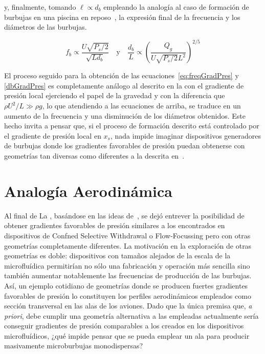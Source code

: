 y, finalmente, tomando $\ell \propto d_{b}$ empleando la analogía al caso de formación de burbujas en una piscina en reposo~\cite{Evangelio2015b}, la expresión final de la frecuencia y los diámetros de las burbujas. 

\begin{equation}
f_{b} \propto \dfrac{U\sqrt{P_{s}/2}}{\sqrt{L d_{b}}} \quad \mathrm{y} \quad \dfrac{d_{b}}{L} \propto \left(\dfrac{Q_{g}}{U\sqrt{P_{s}/2}L^{2}}\right)^{2/5}
\end{equation}

El proceso seguido para la obtención de las ecuaciones~\eqref{eq:freqGradPres} y \eqref{dbGradPres} es completamente análogo al descrito en la  con el gradiente de presión local ejerciendo el papel de la gravedad y con la diferencia que $\rho U^{2}/L \gg \rho g $, lo que atendiendo a las ecuaciones de arriba, se traduce en un aumento de la frecuencia y una disminución de los diámetros obtenidos. Este hecho invita a pensar que, si el proceso de formación descrito está controlado por el gradiente de presión local en $x_{s}$, nada impide imaginar dispositivos generadores de burbujas donde los gradientes favorables de presión puedan obtenerse con geometrías tan diversas como diferentes a la descrita en~\cite{Evangelio2015b}.


\section{Analogía Aerodinámica}

Al final de La , basándose en las ideas de~\cite{Evangelio2015b}, se dejó entrever la posibilidad de obtener gradientes favorables de presión similares a los encontrados en dispositivos de Confned Selective Withdrawal o Flow-Focussing pero con otras geometrías completamente diferentes. La motivación en la exploración de otras geometrías es doble: dispositivos con tamaños alejados de la escala de la microfluídica permitirían no sólo una fabricación y operación más sencilla sino también aumentar notablemente las frecuencias de producción de las burbujas. Así, un ejemplo cotidiano de geometrías donde se producen fuertes gradientes favorables de presión lo constituyen los perfiles aerodinámicos empleados como sección transversal en las alas de los aviones. Dado que la única premisa que, \textit{a priori}, debe cumplir una geometría alternativa a las empleadas actualmente sería conseguir gradientes de presión comparables a los creados en los dispositivos microfluídicos, ¿qué impide pensar que se pueda emplear un ala para producir masivamente microburbujas monodispersas?

